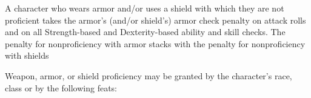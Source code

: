 A character who wears armor and/or uses a shield with which they are not proficient takes the armor's (and/or shield's) armor check penalty on attack rolls and on all Strength-based and Dexterity-based ability and skill checks. The penalty for nonproficiency with armor stacks with the penalty for nonproficiency with shields

Weapon, armor, or shield proficiency may be granted by the character's race, class or by the following feats:

\begin{itemize*}
\item {}
\item {}
\item {}
\item {}
\item {}
\item {}
\item {}
\item {}
\end{itemize*}
